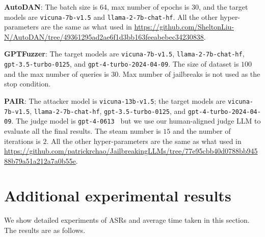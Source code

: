  

\textbf{AutoDAN}:  The batch size is 64, max number of epochs is $30$, and the target models are \texttt{vicuna-7b-v1.5} and \texttt{llama-2-7b-chat-hf}. All the other hyper-parameters are the same as what used in \url{https://github.com/SheltonLiu-N/AutoDAN/tree/49361295ad2ae6f1d3bb163feeabebec34230838}.

\textbf{GPTFuzzer}: The target models are \texttt{vicuna-7b-v1.5}, \texttt{llama-2-7b-chat-hf}, \texttt{gpt-3.5-turbo-0125}, and \texttt{gpt-4-turbo-2024-04-09}. The size of dataset is $100$ and the max number of queries is $30$. Max number of jailbreaks is not used as the stop condition.

\textbf{PAIR}: The attacker model is \texttt{vicuna-13b-v1.5}; the target models are \texttt{vicuna-7b-v1.5}, \texttt{llama-2-7b-chat-hf}, \texttt{gpt-3.5-turbo-0125}, and \texttt{gpt-4-turbo-2024-04-09}. The judge model is \texttt{gpt-4-0613	} but we use our human-aligned judge LLM to evaluate all the final results. The steam number is $15$ and the number of iterations is $2$. All the other hyper-parameters are the same as what used in \url{https://github.com/patrickrchao/JailbreakingLLMs/tree/77e95cbb40d0788bb94588b79a51a212a7a0b55e}.

\newpage
\section{Additional experimental results}\label{app:additional_exp}
We show detailed experiments of ASRs and average time taken in this section. The results are as follows.

